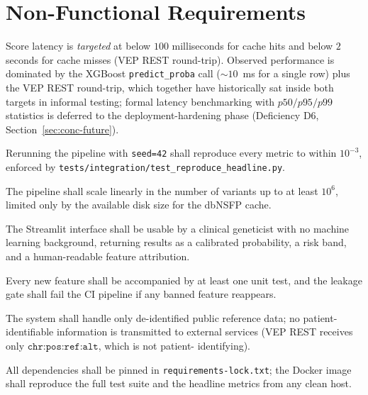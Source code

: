 \documentclass[11pt,a4paper,oneside]{report}
\begin{document}
\section{Non-Functional Requirements}
\label{sec:an-nfr}

\begin{description}[style=nextline,leftmargin=2em]
\item[NFR1 -- Performance.] Score latency is
\emph{targeted} at below $100$ milliseconds for cache hits
and below $2$ seconds for cache misses
(\textsc{VEP} REST round-trip). Observed performance is
dominated by the XGBoost \texttt{predict\_proba} call
($\sim$$10$~ms for a single row) plus the
\textsc{VEP} REST round-trip, which together have
historically sat inside both targets in informal testing;
formal latency benchmarking with $p50/p95/p99$ statistics
is deferred to the deployment-hardening phase
(Deficiency D6, Section~\ref{sec:conc-future}).

\item[NFR2 -- Reliability.] Rerunning the pipeline with
\texttt{seed=42} shall reproduce every metric to within
$10^{-3}$, enforced by
\texttt{tests/integration/test\_reproduce\_headline.py}.

\item[NFR3 -- Scalability.] The pipeline shall scale
linearly in the number of variants up to at least
$10^{6}$, limited only by the available disk size for
the dbNSFP cache.

\item[NFR4 -- Usability.] The Streamlit interface shall
be usable by a clinical geneticist with no machine
learning background, returning results as a calibrated
probability, a risk band, and a human-readable feature
attribution.

\item[NFR5 -- Maintainability.] Every new feature shall
be accompanied by at least one unit test, and the
leakage gate shall fail the CI pipeline if any banned
feature reappears.

\item[NFR6 -- Security and data privacy.] The system
shall handle only de-identified public reference data;
no patient-identifiable information is transmitted to
external services (\textsc{VEP} REST receives only
$\texttt{chr:pos:ref:alt}$, which is not patient-
identifying).

\item[NFR7 -- Reproducibility.] All dependencies shall be
pinned in \texttt{requirements-lock.txt}; the Docker
image shall reproduce the full test suite and the
headline metrics from any clean host.
\end{description}
\end{document}
